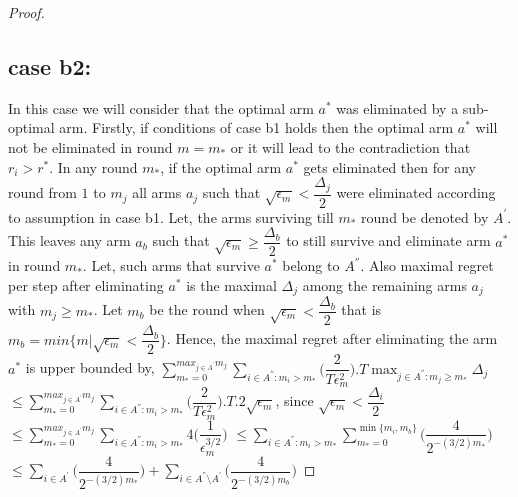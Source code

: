 \begin{proof}
\subsection{case b2:} 
In this case we will consider that the optimal arm $a^{*}$ was eliminated by a sub-optimal arm. Firstly, if conditions of case b1 holds then the optimal arm $a^{*}$ will not be eliminated in round $m=m_{*}$ or it will lead to the contradiction that $r_{i}>r^{*}$. In any round $m_{*}$, if the optimal arm $a^{*}$ gets eliminated then for any round from $1$ to $m_{j}$ all arms $a_{j}$ such that $\sqrt{\epsilon_{m}}<\dfrac{\Delta_{j}}{2}$ were eliminated according to assumption in case b1. Let, the arms surviving till $m_{*}$ round be denoted by $A^{'}$. This leaves any arm $a_{b}$ such that $\sqrt{\epsilon_{m}}\geq\dfrac{\Delta_{b}}{2}$ to still survive and eliminate arm $a^{*}$ in round $m_{*}$. Let, such arms that survive $a^{*}$ belong to $A^{''}$. Also maximal regret per step after eliminating $a^{*}$ is the maximal $\Delta_{j}$ among the remaining arms $a_{j}$ with $m_{j}\geq m_{*}$.  Let $m_{b}$ be the round when $\sqrt{\epsilon_{m}}<\dfrac{\Delta_{b}}{2}$ that is $m_{b}=min\lbrace m|\sqrt{\epsilon_{m}}<\dfrac{\Delta_{b}}{2}\rbrace$. Hence, the maximal regret after eliminating the arm $a^{*}$ is upper bounded by, 
\newline
$\sum_{m_{*}=0}^{max_{j\in A^{'}}m_{j}}\sum_{i\in A^{''}:m_{i}>m_{*}}\bigg(\dfrac{2}{T\epsilon_{m}^{2}} \bigg).T\max_{j\in A^{''}:m_{j}\geq m_{*}}{\Delta}_{j}$
\newline
\hspace*{0em}$\leq\sum_{m_{*}=0}^{max_{j\in A^{'}}m_{j}}\sum_{i\in A^{''}:m_{i}>m_{*}}\bigg(\dfrac{2}{T\epsilon_{m}^{2}} \bigg).T.2\sqrt{\epsilon_{m}}$, since $\sqrt{\epsilon_{m}}<\dfrac{\Delta_{i}}{2}$
\newline
\hspace*{0em}$\leq\sum_{m_{*}=0}^{max_{j\in A^{'}}m_{j}}\sum_{i\in A^{''}:m_{i}>m_{*}}4\bigg(\dfrac{1}{\epsilon_{m}^{3/2}} \bigg) $
\newline
\hspace*{0em}$\leq\sum_{i\in A^{''}:m_{i}>m_{*}}\sum_{m_{*}=0}^{\min{\lbrace m_{i},m_{b}\rbrace}}\bigg(\dfrac{4}{2^{-(3/2)m_{*}}} \bigg) $
\newline
\hspace*{0em}$\leq\sum_{i\in A^{'}}\bigg(\dfrac{4}{2^{-(3/2)m_{*}}} \bigg)+\sum_{i\in A^{''}\setminus A^{'}}\bigg(\dfrac{4}{2^{-(3/2)m_{b}}} \bigg)$

\end{proof}
